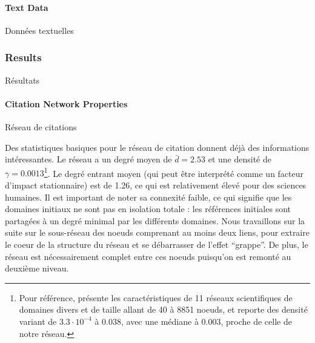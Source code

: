 \paragraph{Text Data}{Données textuelles}




\subsubsection{Results}{Résultats}




\paragraph{Citation Network Properties}{Réseau de citations}


Des statistiques basiques pour le réseau de citation donnent déjà des informations intéressantes. Le réseau a un degré moyen de $\bar{d}=2.53$ et une densité de $\gamma=0.0013$\footnote{Pour référence, \cite{batagelj2003efficient} présente les caractéristiques de 11 réseaux scientifiques de domaines divers et de taille allant de 40 à 8851 noeuds, et reporte des densité variant de $3.3\cdot 10^{-4}$ à $0.038$, avec une médiane à $0.003$, proche de celle de notre réseau.}. Le degré entrant moyen (qui peut être interprété comme un facteur d'impact stationnaire) est de 1.26, ce qui est relativement élevé pour des sciences humaines. Il est important de noter sa connexité faible, ce qui signifie que les domaines initiaux ne sont pas en isolation totale : les références initiales sont partagées à un degré minimal par les différents domaines. Nous travaillons sur la suite sur le sous-réseau des noeuds comprenant au moins deux liens, pour extraire le coeur de la structure du réseau et se débarrasser de l'effet ``grappe''. De plus, le réseau est nécessairement complet entre ces noeuds puisqu'on est remonté au deuxième niveau.



